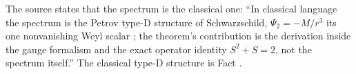 The source states that the spectrum is the classical one: ``In classical language the spectrum is the Petrov type-D structure of Schwarzschild, $\Psi_2 = -M/r^{3}$ its one nonvanishing Weyl scalar \cite{Chandrasekhar1983}; the theorem's contribution is the derivation inside the gauge formalism and the exact operator identity $S^{2} + S = 2$, not the spectrum itself.'' The classical type-D structure is Fact .
